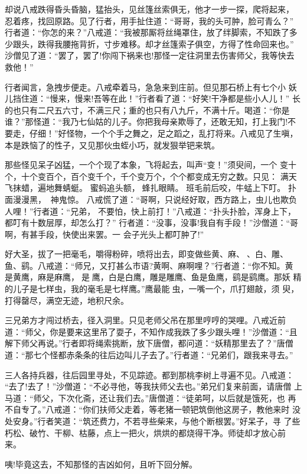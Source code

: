 却说八戒跌得昏头昏脑，猛抬头，见丝篷丝索俱无，他才一步一探，爬将起来，
忍着疼，找回原路。见了行者，用手扯住道：“哥哥，我的头可肿，脸可青么？”
行者道：“你怎的来？”八戒道：“我被那厮将丝绳罩住，放了绊脚索，不知跌了多
少跟头，跌得我腰拖背折，寸步难移。却才丝篷索子俱空，方得了性命回来也。”
沙僧见了道：“罢了，罢了!你闯下祸来也!那怪一定往洞里去伤害师父，我等快去
救他！”

行者闻言，急拽步便走。八戒牵着马，急急来到庄前。但见那石桥上有七个小
妖儿挡住道：“慢来，慢来!吾等在此！”行者看了道：“好笑!干净都是些小人儿！”
长的也只有二尺五六寸，不满三尺；重的也只有八九斤，不满十斤。喝道：“你是
谁？”那怪道：“我乃七仙姑的儿子。你把我母亲欺辱了，还敢无知，打上我门!不
要走，仔细！”好怪物，一个个手之舞之，足之蹈之，乱打将来。八戒见了生嗔，
本是跌恼了的性子，又见那伙虫蛭小巧，就发狠举钯来筑。

那些怪见呆子凶猛，一个个现了本象，飞将起去，叫声“变！”须臾间，一个
变十个，十个变百个，百个变千个，千个变万个，个个都变成无穷之数。只见：
满天飞抹蜡，遍地舞蜻蜓。
蜜蚂追头额，蜂扎眼睛。
班毛前后咬，牛蜢上下叮。
扑面漫漫黑，神鬼惊。
八戒慌了道：“哥啊，只说经好取，西方路上，虫儿也欺负人哩！”行者道：“兄弟，
不要怕，快上前打！”八戒道：“扑头扑脸，浑身上下，都叮有十数层厚，却怎么打？”
行者道：“没事，没事!我自有手段！”沙僧道：“哥啊，有甚手段，快使出来罢。一
会子光头上都叮肿了!”

好大圣，拔了一把毫毛，嚼得粉碎，喷将出去，即变做些黄、麻、、白、雕、
鱼、鹞。八戒道：“师兄，又打甚么市语?黄啊、麻啊哩？”行者道：“你不知。黄
是黄鹰，麻是麻鹰，是鹰，白是白鹰，雕是雕鹰、鱼是鱼鹰，鹞是鹞鹰。那妖
精的儿子是七样虫，我的毫毛是七样鹰。”鹰最能虫，一嘴一个，爪打翅敲，须
臾，打得罄尽，满空无迹，地积尺余。

三兄弟方才闯过桥去，径入洞里。只见老师父吊在那里哼哼的哭哩。八戒近前
道：“师父，你是要来这里吊了耍子，不知作成我跌了多少跟头哩！”沙僧道：“且
解下师父再说。”行者即将绳索挑断，放下唐僧，都问道：“妖精那里去了？”唐僧
道：“那七个怪都赤条条的往后边叫儿子去了。”行者道：“兄弟们，跟我来寻去。”

三人各持兵器，往后园里寻处，不见踪迹。都到那桃李树上寻遍不见。八戒道：
“去了!去了！”沙僧道：“不必寻他，等我扶师父去也。”弟兄们复来前面，请唐僧
上马道：“师父，下次化斋，还让我们去。”唐僧道：“徒弟呵，以后就是饿死，也
再不自专了。”八戒道：“你们扶师父走着，等老猪一顿钯筑倒他这房子，教他来时
没处安身。”行者笑道：“筑还费力，不若寻些柴来，与他个断根罢。”好呆子，寻
了些朽松、破竹、干柳、枯藤，点上一把火，烘烘的都烧得干净。师徒却才放心前
来。

咦!毕竟这去，不知那怪的吉凶如何，且听下回分解。